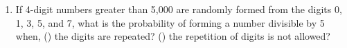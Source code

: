 \documentclass[12pt]{article}
\begin{document}
\begin{enumerate}
\item
If 4-digit numbers greater than 5,000 are randomly formed from the digits 0, 1, 3, 5, and 7, what is the probability of forming a number divisible by 5 when, () the digits are repeated? () the repetition of digits is not allowed?
\end{enumerate}
\end{document}
